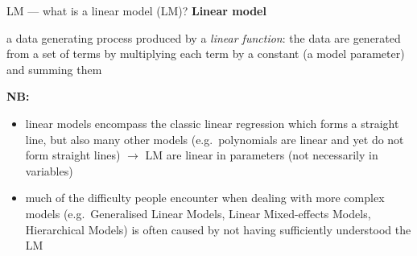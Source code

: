 \documentclass[
  10pt,
  ignorenonframetext,
  aspectratio=169,
  t]{beamer}
\providecommand{\tightlist}{%
  \setlength{\itemsep}{0pt}\setlength{\parskip}{0pt}}
\newcommand{\blueit}[1]{\textcolor{bluebeamer}{\emph{#1}}}
\newcommand{\bluebold}[1]{\textcolor{bluebeamer}{\textbf{#1}}}
\begin{document}
\begin{frame}{LM --- what is a linear model (LM)?}
\protect{}\label{lm-what-is-a-linear-model-lm}
\bluebold{Linear model}

a data generating process produced by a \blueit{linear function}: the
data are generated from a set of terms by multiplying each term by a
constant (a model parameter) and summing them

\pause

\vspace{1em}

\textbf{NB:}

\begin{itemize}
\tightlist
\item
  linear models encompass the classic linear regression which forms a
  straight line, but also many other models (e.g.~polynomials are linear
  and yet do not form straight lines) \(\rightarrow\) LM are linear in
  parameters (not necessarily in variables)
\item
  much of the difficulty people encounter when dealing with more complex
  models (e.g.~Generalised Linear Models, Linear Mixed-effects Models,
  Hierarchical Models) is often caused by not having sufficiently
  understood the LM
\end{itemize}
\end{frame}
\end{document}
